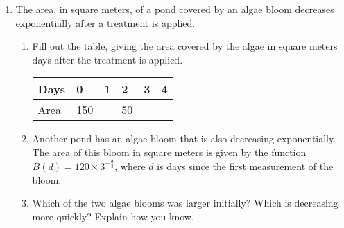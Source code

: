 \documentclass[12pt, twoside]{article}
\begin{document}
\begin{enumerate}
\item The area, in square meters, of a pond covered by an algae bloom decreases exponentially after a treatment is applied.
\begin{enumerate}[itemsep=1cm]
    \item Fill out the table, giving the area covered by the algae in square meters days after the treatment is applied.
    \begin{center}
    \begin{tabular}{|p{1cm}|p{1cm}|p{1cm}|p{1cm}|p{1cm}|p{1cm}|}
        \hline
        Days & 0 & 1 & 2 & 3 & 4 \\
        \hline
        Area & 150 & & 50 & & \\[0.25cm]
        \hline
    \end{tabular}
    \end{center}
    \item Another pond has an algae bloom that is also decreasing exponentially. The
    area of this bloom in square meters is given by the function $B(d)=120 \times 3^{-\frac{d}{3}}$, where $d$ is days since the first measurement of the bloom. 
    \begin{center}
        \end{center}
    \item Which of the two algae blooms was larger initially? Which is decreasing more quickly? Explain how you know.
\end{enumerate}


\end{enumerate}
\end{document}

